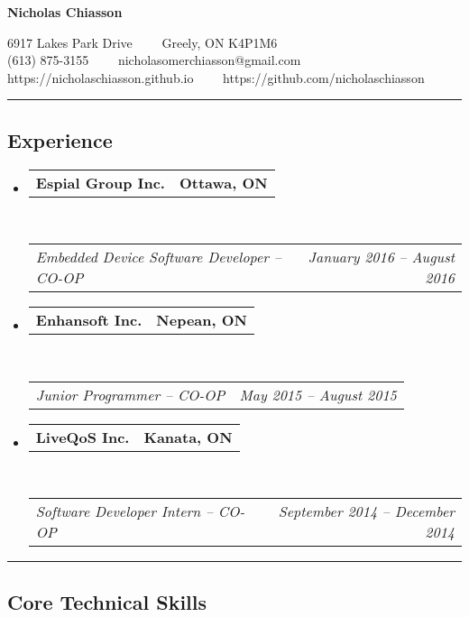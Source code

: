 \documentclass[10pt,letterpaper]{article}
\makeatletter
\newcommand{\headerrow}[2]
{\begin{tabular*}{\linewidth}{l@{\extracolsep{\fill}}r}
  #1 &
  #2 \\
\end{tabular*}}
\makeatother
\begin{document}
\begin{center}
{\LARGE \textbf{Nicholas Chiasson}}

6917 Lakes Park Drive\ \ \textbullet
\ \ Greely, ON K4P1M6
\\
(613) 875-3155\ \ \textbullet
\ \ nicholasomerchiasson@gmail.com
\\
https://nicholaschiasson.github.io\ \ \textbullet
\ \ https://github.com/nicholaschiasson
\end{center}

\hrule
\vspace{-0.4em}
\subsection*{Experience}

\begin{itemize}
  \parskip=0.1em

  \item
  \headerrow
    {\textbf{Espial Group Inc.}}
    {\textbf{Ottawa, ON}}
  \\
  \headerrow
    {\emph{Embedded Device Software Developer -- CO-OP}}
    {\emph{January 2016 -- August 2016}}

  \item
  \headerrow
    {\textbf{Enhansoft Inc.}}
    {\textbf{Nepean, ON}}
  \\
  \headerrow
    {\emph{Junior Programmer -- CO-OP}}
    {\emph{May 2015 -- August 2015}}

  \item
  \headerrow
    {\textbf{LiveQoS Inc.}}
    {\textbf{Kanata, ON}}
  \\
  \headerrow
    {\emph{Software Developer Intern -- CO-OP}}
    {\emph{September 2014 -- December 2014}}

\end{itemize}

\hrule
\vspace{-0.4em}
\subsection*{Core Technical Skills}
\end{document}
